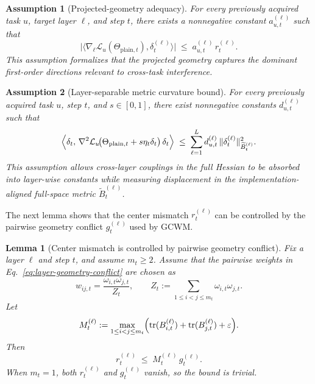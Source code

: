 \documentclass{article}
\newtheorem{lemma}{Lemma}
\newtheorem{assumption}{Assumption}
\begin{document}
\begin{assumption}[Projected-geometry adequacy]
\label{ass:geometry_adequacy_appendix_final}
For every previously acquired task \(u\), target layer \(\ell\), and step \(t\), there exists a nonnegative constant \(a_{u,t}^{(\ell)}\) such that
\begin{equation}
\bigl|
\langle
\nabla_{\ell}\mathcal L_u(\Theta_{\mathrm{plain},t}),
\delta_t^{(\ell)}
\rangle
\bigr|
\;\le\;
a_{u,t}^{(\ell)}\, r_t^{(\ell)}.
\label{eq:geometry_adequacy_appendix_final}
\end{equation}
This assumption formalizes that the projected geometry captures the dominant first-order directions relevant to cross-task interference.
\end{assumption}

\begin{assumption}[Layer-separable metric curvature bound]
\label{ass:metric_curvature_appendix_final}
For every previously acquired task \(u\), step \(t\), and \(s\in[0,1]\), there exist nonnegative constants \(d_{u,t}^{(\ell)}\) such that
\begin{equation}
\Bigl\langle
\delta_t,\,
\nabla^2\mathcal L_u\!\bigl(\Theta_{\mathrm{plain},t}+s\eta_t\delta_t\bigr)\,
\delta_t
\Bigr\rangle
\;\le\;
\sum_{\ell=1}^L
d_{u,t}^{(\ell)}
\,
\|\delta_t^{(\ell)}\|_{\widetilde B_t^{(\ell)}}^2.
\label{eq:metric_curvature_appendix_final}
\end{equation}
This assumption allows cross-layer couplings in the full Hessian to be absorbed into layer-wise constants while measuring displacement in the implementation-aligned full-space metric \(\widetilde B_t^{(\ell)}\).
\end{assumption}

The next lemma shows that the center mismatch \(r_t^{(\ell)}\) can be controlled by the pairwise geometry conflict \(g_t^{(\ell)}\) used by GCWM.

\begin{lemma}[Center mismatch is controlled by pairwise geometry conflict]
\label{lem:center_mismatch_to_conflict}
Fix a layer \(\ell\) and step \(t\), and assume \(m_t \ge 2\). Assume that the pairwise weights in Eq.~\eqref{eq:layer-geometry-conflict} are chosen as
\[
w_{ij,t}
=
\frac{\omega_{i,t}\omega_{j,t}}{Z_t},
\qquad
Z_t:=\sum_{1\le i<j\le m_t}\omega_{i,t}\omega_{j,t}.
\]
Let
\begin{equation}
M_t^{(\ell)}
:=
\max_{1\le i<j\le m_t}
\Bigl(
\mathrm{tr}(B_{i,t}^{(\ell)})
+
\mathrm{tr}(B_{j,t}^{(\ell)})
+\varepsilon
\Bigr).
\label{eq:trace_scale_constant}
\end{equation}
Then
\begin{equation}
r_t^{(\ell)}
\;\le\;
M_t^{(\ell)}\, g_t^{(\ell)}.
\label{eq:center_mismatch_bound}
\end{equation}
When \(m_t=1\), both \(r_t^{(\ell)}\) and \(g_t^{(\ell)}\) vanish, so the bound is trivial.
\end{lemma}
\end{document}
